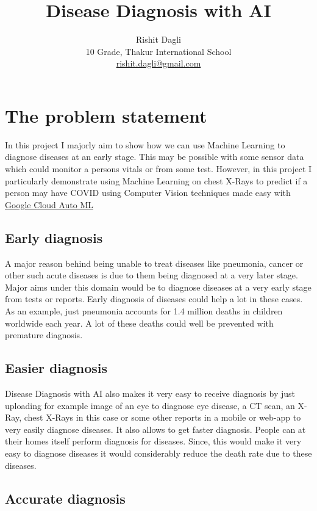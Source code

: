 \documentclass[a4paper]{article}
\title{Disease Diagnosis with AI}
\author{Rishit Dagli \\ 
        10 Grade, Thakur International School \\
        \href{mailto:rishit.dagli@gmail.com}{rishit.dagli@gmail.com} }
\date{}
\begin{document}
\maketitle

\section{The problem statement}

In this project I majorly aim to show how we can use Machine Learning to diagnose diseases at an early stage. This may be possible with some sensor data which could monitor a persons vitals or from some test. However, in this project I particularly demonstrate using Machine Learning on chest X-Rays to predict if a person may have COVID using Computer Vision techniques made easy with \href{https://cloud.google.com/automl}{Google Cloud Auto ML}

\subsection{Early diagnosis}

\qquad A major reason behind being unable to treat diseases like pneumonia, cancer or other such acute diseases is due to them being diagnosed at a very later stage. Major aims under this domain would be to diagnose diseases at a very early stage from tests or reports. Early diagnosis of diseases could help a lot in these cases. As an example, just pneumonia accounts for 1.4 million deaths in children worldwide each year. A lot of these deaths could well be prevented with premature diagnosis. 

\subsection{Easier diagnosis}

\qquad Disease Diagnosis with AI also makes it very easy to receive diagnosis by just uploading for example image of an eye to diagnose eye disease, a CT scan, an X-Ray, chest X-Rays in this case or some other reports in a mobile or web-app to very easily diagnose diseases. It also allows to get faster diagnosis. People can at their homes itself perform diagnosis for diseases. Since, this would make it very easy to diagnose diseases it would considerably reduce the death rate due to these diseases.

\subsection{Accurate diagnosis}
\end{document}
